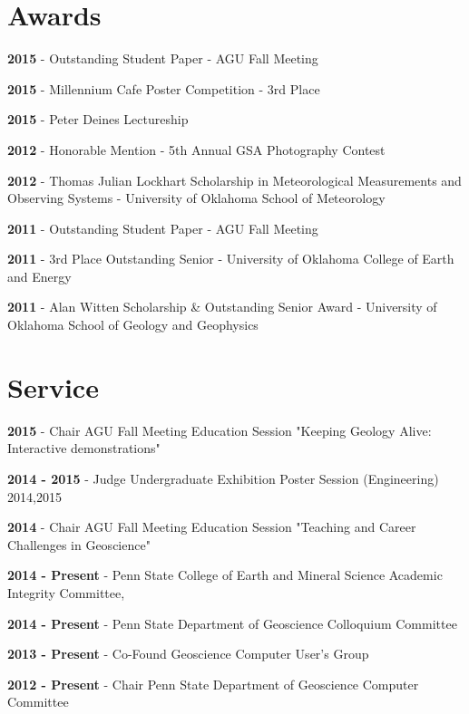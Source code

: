 \documentclass[letterpaper]{article}
\renewenvironment{itemize}{
  \begin{list}{}{
    \setlength{\leftmargin}{1.5em}
  }
}{
  \end{list}
}
\begin{document}
\section*{Awards}
\begin{itemize}
\item \textbf{2015} - Outstanding Student Paper - AGU Fall Meeting    
\item \textbf{2015} - Millennium Cafe Poster Competition - 3rd Place
\item \textbf{2015} - Peter Deines Lectureship
\item \textbf{2012} - Honorable Mention - 5th Annual GSA Photography Contest
\item \textbf{2012} - Thomas Julian Lockhart Scholarship in Meteorological Measurements and Observing Systems - University of Oklahoma School of Meteorology
\item \textbf{2011} - Outstanding Student Paper - AGU Fall Meeting
\item \textbf{2011} - 3rd Place Outstanding Senior - University of Oklahoma College of Earth and Energy 
\item \textbf{2011} -  Alan Witten Scholarship \& Outstanding Senior Award - University of Oklahoma School of Geology and Geophysics 
\end{itemize}

\newpage
\section*{Service}
\begin{itemize}
\item \textbf{2015} - Chair AGU Fall Meeting Education Session "Keeping Geology Alive: Interactive demonstrations"
\item \textbf{2014 - 2015} - Judge Undergraduate Exhibition Poster Session (Engineering) 2014,2015
\item \textbf{2014} - Chair AGU Fall Meeting  Education Session "Teaching and Career Challenges in Geoscience" 
\item \textbf{2014 - Present} - Penn State College of Earth and Mineral Science Academic Integrity Committee, 
\item \textbf{2014 - Present} - Penn State Department of Geoscience Colloquium Committee
\item \textbf{2013 - Present} - Co-Found Geoscience Computer User's Group
\item \textbf{2012 - Present} - Chair Penn State Department of Geoscience Computer Committee
\end{itemize}
\end{document}
